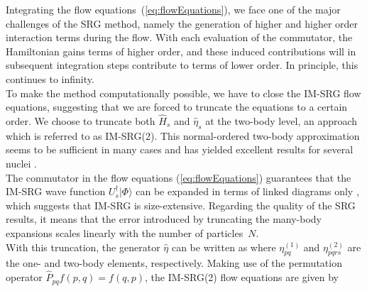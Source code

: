\documentclass[aps,twocolumn,showpacs,floatfix,nofootinbib,preprintnumbers,superscriptaddress,amsmath,amssymb]{revtex4-1}
\begin{document}
Integrating the flow equations~(\ref{eq:flowEquations}), we face one of the major challenges of the SRG method, namely the generation of higher and higher order interaction terms during the flow. With each evaluation of the commutator, the Hamiltonian gains terms of higher order,  and these induced contributions will in subsequent integration steps contribute to terms of lower order. In principle, this continues to infinity.\\
To make the method computationally possible, we have to close the IM-SRG flow equations, suggesting that we are forced to truncate the equations to a certain order. We choose
to truncate both $\hat{H}_s$ and $\hat{\eta}_s$ at the two-body level, an approach which is referred to as IM-SRG(2).
This normal-ordered two-body approximation seems to be sufficient in many cases and has yielded excellent results for several nuclei \cite{PhysRevLett.106.222502,PhysRevLett.109.052501,IMSRG}.\\
 The commutator in the flow equations (\ref{eq:flowEquations}) guarantees that the IM-SRG wave function $U_s^\dagger|\Phi\rangle$ can be expanded in terms of linked diagrams only \cite{shavitt2009many,ISI:A1981MN73700014}, which suggests that IM-SRG is size-extensive. Regarding the quality of the SRG results, it means that the error introduced by truncating the many-body expansions scales linearly with the number of particles~$N$.\\
With this truncation, the generator $\hat{\eta}$ can be written as
where $\eta_{pq}^{(1)}$ and $ \eta_{pqrs}^{(2)}$  are the one- and two-body elements, respectively. Making use of the permutation operator 
$ \hat{P}_{pq}f(p,q) = f(q,p)$, the IM-SRG(2) flow equations are given by 
\end{document}
